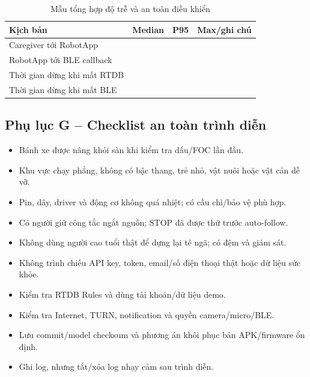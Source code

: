 \begin{table}[htbp]
\centering
\caption{Mẫu tổng hợp độ trễ và an toàn điều khiển}
\begin{tabularx}{\textwidth}{|p{4.0cm}|X|X|X|}
\hline
Kịch bản & Median & P95 & Max/ghi chú \\
\hline
Caregiver tới RobotApp & & & \\
\hline
RobotApp tới BLE callback & & & \\
\hline
Thời gian dừng khi mất RTDB & & & \\
\hline
Thời gian dừng khi mất BLE & & & \\
\hline
\end{tabularx}
\end{table}

\subsection*{Phụ lục G -- Checklist an toàn trình diễn}

\begin{itemize}
    \item Bánh xe được nâng khỏi sàn khi kiểm tra dấu/FOC lần đầu.
    \item Khu vực chạy phẳng, không có bậc thang, trẻ nhỏ, vật nuôi hoặc vật cản dễ vỡ.
    \item Pin, dây, driver và động cơ không quá nhiệt; có cầu chì/bảo vệ phù hợp.
    \item Có người giữ công tắc ngắt nguồn; STOP đã được thử trước auto-follow.
    \item Không dùng người cao tuổi thật để dựng lại té ngã; có đệm và giám sát.
    \item Không trình chiếu API key, token, email/số điện thoại thật hoặc dữ liệu sức khỏe.
    \item Kiểm tra RTDB Rules và dùng tài khoản/dữ liệu demo.
    \item Kiểm tra Internet, TURN, notification và quyền camera/micro/BLE.
    \item Lưu commit/model checksum và phương án khôi phục bản APK/firmware ổn định.
    \item Ghi log, nhưng tắt/xóa log nhạy cảm sau trình diễn.
\end{itemize}
